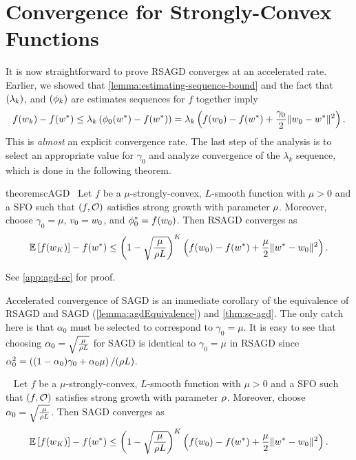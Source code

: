 \section{Convergence for Strongly-Convex Functions}\label{sec:agd-sc}

It is now straightforward to prove \ac{RSAGD} converges at an accelerated rate. 
Earlier, we showed that \autoref{lemma:estimating-sequence-bound} and the fact that \( \seq{\lambda_k} \), and \( \seq{\phi_k} \) are estimates sequences for \( f \) together imply
\[ f(\wk) - f(\wopt) \leq \lambda_k \rbr{\phi_0(\wopt) - f(\wopt)} = \lambda_k \rbr{f(\w_0) - f(\wopt) + \frac{\gamma_0}{2} \norm{\w_0 - \wopt}^2}. \]
This is \emph{almost} an explicit convergence rate. 
The last step of the analysis is to select an appropriate value for \( \gamma_0 \) and analyze convergence of the \( \lambda_k \) sequence, which is done in the following theorem.

\begin{restatable}{theorem}{scAGD}~\label{thm:sc-agd}
    Let \( f \) be a \( \mu \)-strongly-convex, \( L \)-smooth function with \( \mu > 0 \) and \oracle{} a \ac{SFO} such that \( \rbr{f, \oracle{}} \) satisfies strong growth with parameter \( \sgc \).
    Moreover, choose \( \gamma_0 = \mu \), \( v_0 = \w_0 \), and \( \phi_0^* = f(\w_0) \).
    Then \ac{RSAGD} converges as  
    \[ \E\sbr{f(\w_K)} - f(\wopt) \leq \rbr{1 - \sqrt{\frac{\mu}{\sgc L}}}^{K} \rbr{ f(w_0) - f(\wopt) + \frac{\mu}{2} \norm{\wopt - \w_0}^2 }.  \]
\end{restatable}
\noindent See \autoref{app:agd-sc} for proof.\hfill \break

Accelerated convergence of \ac{SAGD} is an immediate corollary of the equivalence of \ac{RSAGD} and \ac{SAGD} (\autoref{lemma:agdEquivalence}) and \autoref{thm:sc-agd}.
The only catch here is that \( \alpha_0 \) must be selected to correspond to \( \gamma_0 = \mu \).
It is easy to see that choosing \( \alpha_0 = \sqrt{\frac{\mu}{\sgc L}} \) for \ac{SAGD} is identical to \( \gamma_0 = \mu \) in \ac{RSAGD} since \( \alpha_0^2 = \rbr{(1 - \alpha_0)\gamma_0 + \alpha_0 \mu} / (\sgc L) \).

\begin{corollary}~\label{cor:sc-agd}
    Let \( f \) be a \( \mu \)-strongly-convex, \( L \)-smooth function with \( \mu > 0 \) and \oracle{} a \ac{SFO} such that \( \rbr{f, \oracle{}} \) satisfies strong growth with parameter \( \sgc \).
    Moreover, choose \( \alpha_0 = \sqrt{\frac{\mu}{\sgc L}} \). 
    Then \ac{SAGD} converges as  
    \[ \E\sbr{f(\w_K)} - f(\wopt) \leq \rbr{1 - \sqrt{\frac{\mu}{\sgc L}}}^{K} \rbr{ f(w_0) - f(\wopt) + \frac{\mu}{2} \norm{\wopt - \w_0}^2 }.  \]
\end{corollary}

